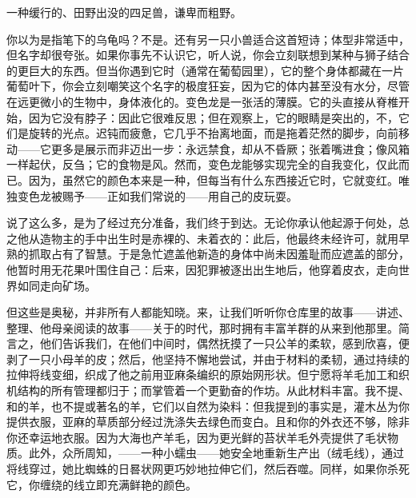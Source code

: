 一种缓行的、田野出没的四足兽，\newline{}谦卑而粗野。\par

你以为是指笔下的乌龟吗？不是。还有另一只小兽适合这首短诗；体型非常适中，但名字却很夸张。如果你事先不认识它，听人说，你会立刻联想到某种与狮子结合的更巨大的东西。但当你遇到它时（通常在葡萄园里），它的整个身体都藏在一片葡萄叶下，你会立刻嘲笑这个名字的极度狂妄，因为它的体内甚至没有水分，尽管在远更微小的生物中，身体液化的。变色龙是一张活的薄膜。它的头直接从脊椎开始，因为它没有脖子：因此它很难反思；但在观察上，它的眼睛是突出的，不，它们是旋转的光点。迟钝而疲惫，它几乎不抬离地面，而是拖着茫然的脚步，向前移动——它更多是展示而非迈出一步：永远禁食，却从不昏厥；张着嘴进食；像风箱一样起伏，反刍；它的食物是风。然而，变色龙能够实现完全的自我变化，仅此而已。因为，虽然它的颜色本来是一种，但每当有什么东西接近它时，它就变红。唯独变色龙被赐予——正如我们常说的——用自己的皮玩耍。\par

说了这么多，是为了经过充分准备，我们终于到达。无论你承认他起源于何处，总之他从造物主的手中出生时是赤裸的、未着衣的：此后，他最终未经许可，就用早熟的抓取占有了智慧。于是急忙遮盖他新造的身体中尚未因羞耻而应遮盖的部分，他暂时用无花果叶围住自己：后来，因犯罪被逐出出生地后，他穿着皮衣，走向世界如同走向矿场。\par

但这些是奥秘，并非所有人都能知晓。来，让我们听听你仓库里的故事——讲述、整理、他母亲阅读的故事——关于的时代，那时拥有丰富羊群的从来到他那里。简言之，他们告诉我们，在他们中间时，偶然抚摸了一只公羊的柔软，感到欣喜，便剥了一只小母羊的皮；然后，他坚持不懈地尝试，并由于材料的柔韧，通过持续的拉伸将线变细，织成了他之前用亚麻条编织的原始网形状。但宁愿将羊毛加工和织机结构的所有管理都归于；而掌管着一个更勤奋的作坊。从此材料丰富。我不提、和的羊，也不提或著名的羊，它们以自然为染料：但我提到的事实是，灌木丛为你提供衣服，亚麻的草质部分经过洗涤失去绿色而变白。且和你的外衣还不够，除非你还幸运地衣服。因为大海也产羊毛，因为更光鲜的苔状羊毛外壳提供了毛状物质。此外，众所周知，——一种小蠕虫——她安全地重新生产出（绒毛线），通过将线穿过，她比蜘蛛的日晷状网更巧妙地拉伸它们，然后吞噬。同样，如果你杀死它，你缠绕的线立即充满鲜艳的颜色。\par

